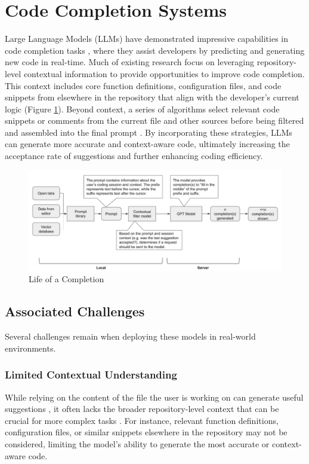 \section{Code Completion Systems}

Large Language Models (LLMs) have demonstrated impressive capabilities in code completion tasks \cite{codeium, marscode, copilot}, where they assist developers by predicting and generating new code in real-time. Much of existing research focus on leveraging repository-level contextual information to provide opportunities to improve code completion. This context includes core function definitions, configuration files, and code snippets from elsewhere in the repository that align with the developer’s current logic (Figure \ref{fig:completion}). Beyond context, a series of algorithms select relevant code snippets or comments from the current file and other sources before being filtered and assembled into the final prompt \cite{copilotx}. By incorporating these strategies, LLMs can generate more accurate and context-aware code, ultimately increasing the acceptance rate of suggestions and further enhancing coding efficiency. 

\begin{figure}
    \centering
    \includegraphics[width=0.8\linewidth]{fig/completion.png}
    \caption{Life of a Completion}
    \label{fig:completion}
\end{figure}

\subsection{Associated Challenges}

Several challenges remain when deploying these models in real-world environments.

\subsubsection{Limited Contextual Understanding}
While relying on the content of the file the user is working on can generate useful suggestions \cite{copilotx}, it often lacks the broader repository-level context that can be crucial for more complex tasks \cite{banerjee2024contextmatterspushingboundaries}. For instance, relevant function definitions, configuration files, or similar snippets elsewhere in the repository may not be considered, limiting the model’s ability to generate the most accurate or context-aware code.


